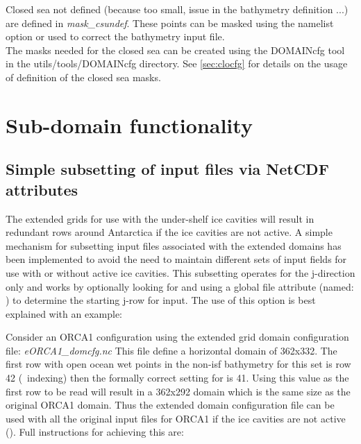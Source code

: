 \documentclass[../main/NEMO_manual]{subfiles}
\begin{document}
Closed sea not defined (because too small, issue in the bathymetry definition ...) are defined in \textit{mask\_csundef}.
These points can be masked using the namelist option  or used to correct the bathymetry input file.\\

The masks needed for the closed sea can be created using the DOMAINcfg tool in the utils/tools/DOMAINcfg directory.
See \autoref{sec:clocfg} for details on the usage of definition of the closed sea masks.

\section{Sub-domain functionality}
\label{sec:MISC_zoom}

\subsection{Simple subsetting of input files via NetCDF attributes}

The extended grids for use with the under-shelf ice cavities will result in redundant rows
around Antarctica if the ice cavities are not active.  A simple mechanism for subsetting
input files associated with the extended domains has been implemented to avoid the need to
maintain different sets of input fields for use with or without active ice cavities.  This
subsetting operates for the j-direction only and works by optionally looking for and using
a global file attribute (named: ) to determine the starting j-row
for input.  The use of this option is best explained with an example:
\medskip

\noindent Consider an ORCA1
configuration using the extended grid domain configuration file: \textit{eORCA1\_domcfg.nc}
This file define a horizontal domain of 362x332.  The first row with
open ocean wet points in the non-isf bathymetry for this set is row 42 (\fortran\ indexing)
then the formally correct setting for  is 41.  Using this value as
the first row to be read will result in a 362x292 domain which is the same size as the
original ORCA1 domain.  Thus the extended domain configuration file can be used with all
the original input files for ORCA1 if the ice cavities are not active ().  Full instructions for achieving this are:
\end{document}

